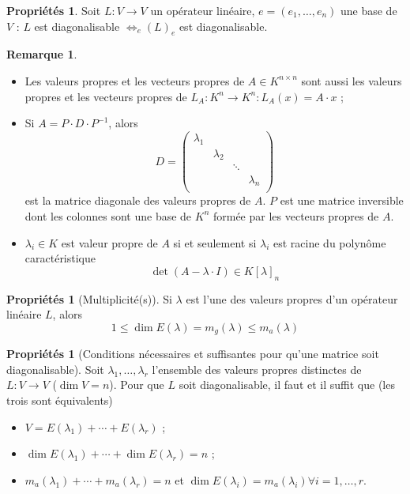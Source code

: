 \documentclass[11pt,a4paper]{article}
\theoremstyle{definition}
\newtheorem{myprop}[mydef]{Propriétés}
\newtheorem{myrem}[mydef]{Remarque}
\DeclareMathOperator{\newdet}{det}
\DeclareMathOperator{\newdim}{dim}
\newcommand*\InsertTheoremBreak{%
  \begingroup %
    \setlength\itemsep{0pt}%
    \setlength\parsep{0pt}%
    \item[\vbox{\null}]%
  \endgroup%
 }%
\begin{document}
\begin{myprop} Soit $L : V \rightarrow V$ un opérateur linéaire, $e = (e_1, \dots, e_n)$ une base de $V$ : $L$ est diagonalisable $\Leftrightarrow _e\!(L)_e$ est diagonalisable.
\end{myprop}

\begin{myrem}
\InsertTheoremBreak
\begin{itemize}
\item Les valeurs propres et les vecteurs propres de $A \in K^{n \times n}$ sont aussi les valeurs propres et les vecteurs propres de $L_A : K^n \rightarrow K^n : L_A(x) = A \cdot x$ ;
\item Si $A = P\cdot D \cdot P^{-1}$, alors \[ D = \begin{pmatrix} \lambda_1 &  &  &  \\
																																   & \lambda_2 &  & \\
																																  & & \ddots & \\
																																  & & & \lambda_n \\
																																  \end{pmatrix} \]
est la matrice diagonale des valeurs propres de $A$. $P$ est une matrice inversible dont les colonnes sont une base de $K^n$ formée par les vecteurs propres de $A$.
\item $\lambda_i \in K$ est valeur propre de $A$ si et seulement si $\lambda_i$ est racine du polynôme caractéristique
\[ \newdet (A - \lambda \cdot I) \in K[\lambda]_n \]
\end{itemize}
\end{myrem}

\begin{myprop}[Multiplicité(s)]
Si $\lambda$ est l'une des valeurs propres d'un opérateur linéaire $L$, alors
\[ 1 \leq \newdim E(\lambda) = m_g (\lambda) \leq m_a (\lambda) \]
\end{myprop}

\begin{myprop}[Conditions nécessaires et suffisantes pour qu'une matrice soit diagonalisable]
Soit $\lambda_1 , \dots , \lambda_r$ l'ensemble des valeurs propres distinctes de $L : V \rightarrow V$ ($\newdim V = n$). Pour que $L$ soit diagonalisable, il faut et il suffit que (les trois sont équivalents)
\begin{itemize}
\item $V = E(\lambda_1) + \cdots + E(\lambda_r)$ ;
\item $ \newdim E(\lambda_1) + \cdots + \newdim E(\lambda_r) = n$ ;
\item $m_a (\lambda_1) + \cdots + m_a (\lambda_r) = n$ et $\newdim E(\lambda_i) = m_a (\lambda_i) \forall i = 1, \dots, r$.
\end{itemize}
\end{myprop}
\end{document}
